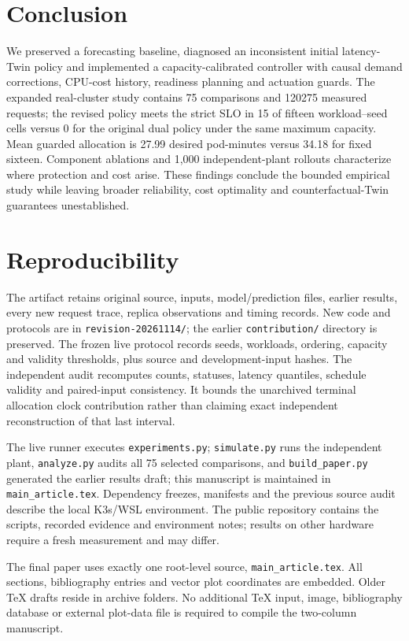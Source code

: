 \documentclass[10pt,twocolumn,a4paper]{article}
\begin{document}
\section{Conclusion}


We preserved a forecasting baseline, diagnosed an inconsistent initial latency-Twin policy and implemented a capacity-calibrated controller with causal demand corrections, CPU-cost history, readiness planning and actuation guards. The expanded real-cluster study contains 75 comparisons and 120275 measured requests; the revised policy meets the strict SLO in 15 of fifteen workload--seed cells versus 0 for the original dual policy under the same maximum capacity. Mean guarded allocation is 27.99 desired pod-minutes versus 34.18 for fixed sixteen. Component ablations and 1,000 independent-plant rollouts characterize where protection and cost arise. These findings conclude the bounded empirical study while leaving broader reliability, cost optimality and counterfactual-Twin guarantees unestablished.


\appendix
\section{Reproducibility}
The artifact retains original source, inputs, model/prediction files, earlier results, every new request trace, replica observations and timing records. New code and protocols are in \texttt{revision-20261114/}; the earlier \texttt{contribution/} directory is preserved. The frozen live protocol records seeds, workloads, ordering, capacity and validity thresholds, plus source and development-input hashes. The independent audit recomputes counts, statuses, latency quantiles, schedule validity and paired-input consistency. It bounds the unarchived terminal allocation clock contribution rather than claiming exact independent reconstruction of that last interval.

The live runner executes \texttt{experiments.py}; \texttt{simulate.py} runs the independent plant, \texttt{analyze.py} audits all 75 selected comparisons, and \texttt{build\_paper.py} generated the earlier results draft; this manuscript is maintained in \texttt{main\_article.tex}. Dependency freezes, manifests and the previous source audit describe the local K3s/WSL environment. The public repository contains the scripts, recorded evidence and environment notes; results on other hardware require a fresh measurement and may differ.

The final paper uses exactly one root-level source, \texttt{main\_article.tex}. All sections, bibliography entries and vector plot coordinates are embedded. Older TeX drafts reside in archive folders. No additional TeX input, image, bibliography database or external plot-data file is required to compile the two-column manuscript.
\end{document}
